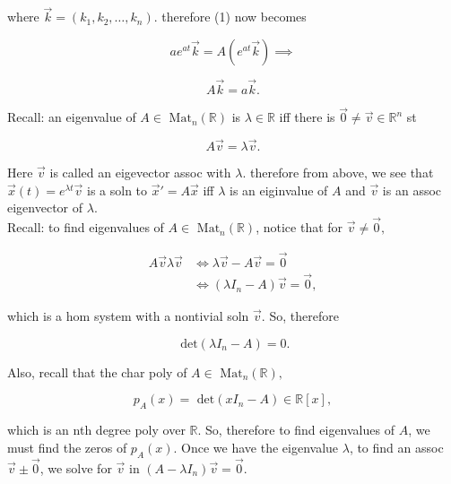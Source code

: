 where \( \vec{k} = (k_1, k_2, \dots , k_n) \). therefore (1) now becomes

\[ ae^{at}\vec{k} = A(e^{at}\vec{k}) \implies  \]

\[ A\vec{k} = a\vec{k}. \]

Recall: an eigenvalue of \( A \in \text{ Mat}_n( \mathbb{R}) \) is
\( \lambda \in \mathbb{R} \) iff there is \( \vec{0} \neq \vec{v} \in
\mathbb{R}^n\) st 

\[ A\vec{v} = \lambda \vec{v}. \]

Here \( \vec{v} \) is called an eigevector assoc with \( \lambda. \)
therefore from above, we see that \( \vec{x}(t) = e^{\lambda t}\vec{v}
\) is a soln to \( \vec{x}' = A \vec{x} \) iff \( \lambda \) is an
eiginvalue of \( A \) and \( \vec{v} \) is an assoc eigenvector of \(
\lambda. \) \\

Recall: to find eigenvalues of \( A \in \text{ Mat}_n( \mathbb{R}) \),
notice that for \( \vec{v} \neq \vec{0}, \)

\begin{align*}
  A\vec{v} \lambda \vec{v} &\iff \lambda \vec{v} - A \vec{v} = \vec{0}\\
  &\iff (\lambda I_n  - A) \vec{v} = \vec{0}, 
\end{align*}

which is a hom system with a nontivial soln \( \vec{v} \). So, therefore

\[ \text{ det}(\lambda I_n -A) = 0.\]

Also, recall that the char poly of \(  A \in \text{ Mat}_n( \mathbb{R}),  \)

\[ p_A(x) = \text{ det}(xI_n-A) \in \mathbb{R}[x], \]

which is an nth degree poly over \( \mathbb{R} \). So, therefore to find
eigenvalues of \( A \), we must find the zeros of \( p_A(x) \). Once we
have the eigenvalue \( \lambda \), to find an assoc \( \vec{v} \pm
\vec{0} \), we solve for \( \vec{v} \) in \( (A - \lambda I_n) \vec{v} =
 \vec{0}\). 

